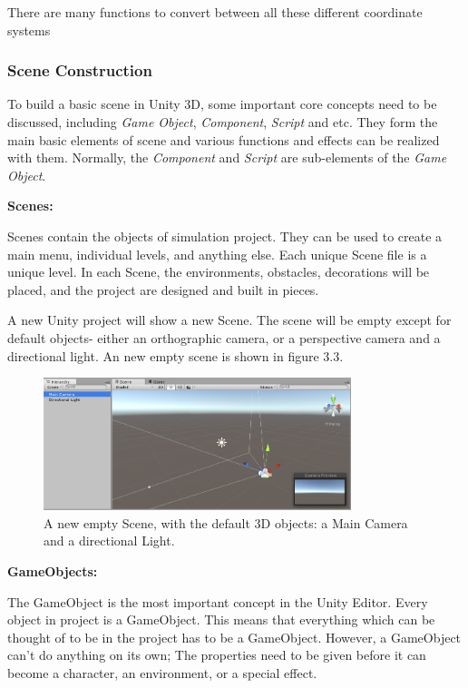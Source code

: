 There are many functions to convert between all these different coordinate systems

\subsubsection*{Scene Construction}

To build a basic scene in Unity 3D, some important core concepts need to be discussed, including \textit{Game Object}, \textit{Component}, \textit{Script} and etc. They form the main basic elements of scene and various functions and effects can be realized with them. Normally, the \textit{Component} and \textit{Script} are sub-elements of the \textit{Game Object}.

\textbf{Scenes:} 

Scenes contain the objects of simulation project. They can be used to create a main menu, individual levels, and anything else. Each unique Scene file is a unique level. In each Scene, the environments, obstacles, decorations will be placed, and the project are designed and built in pieces.

A new Unity project will show a new Scene. The scene will be empty except for default objects- either an orthographic camera, or a  perspective camera and a directional light. An new empty scene is shown in figure 3.3.
\begin{figure}[h]
	\centering
	\includegraphics[width=0.8\textwidth]{Figures/Section3_NewEmptyScene}
	\caption{A new empty Scene, with the default 3D objects: a Main Camera and a directional Light.}
	\label{fig: new empty scene}
\end{figure}

\textbf{GameObjects:} 

The GameObject is the most important concept in the Unity Editor. Every object in project is a GameObject. This means that everything which can be thought of to be in the project has to be a GameObject. However, a GameObject can't do anything on its own; The properties need to be given before it can become a character, an environment, or a special effect.

